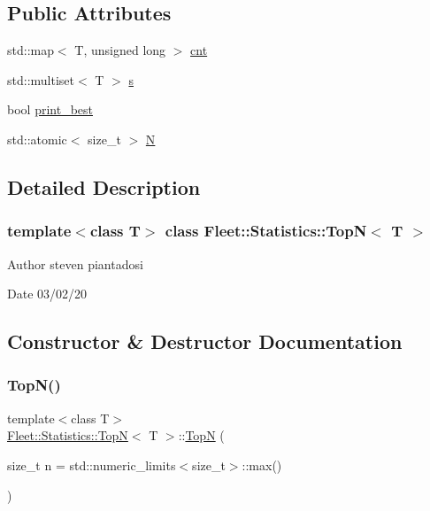 \subsection*{Public Attributes}
\begin{DoxyCompactItemize}
\item 
std\+::map$<$ T, unsigned long $>$ \hyperlink{class_fleet_1_1_statistics_1_1_top_n_a0f5ecded3f85aeeb85da2f2b3056b466}{cnt}
\item 
std\+::multiset$<$ T $>$ \hyperlink{class_fleet_1_1_statistics_1_1_top_n_aa17d03f1154073197161f59657d4c80b}{s}
\item 
bool \hyperlink{class_fleet_1_1_statistics_1_1_top_n_a1ee284a643f14a5c4670b4c5f61f5262}{print\+\_\+best}
\item 
std\+::atomic$<$ size\+\_\+t $>$ \hyperlink{class_fleet_1_1_statistics_1_1_top_n_a7a9612e75b42451eef7db77498050e7a}{N}
\end{DoxyCompactItemize}


\subsection{Detailed Description}
\subsubsection*{template$<$class T$>$\newline
class Fleet\+::\+Statistics\+::\+Top\+N$<$ T $>$}

\begin{DoxyAuthor}{Author}
steven piantadosi 
\end{DoxyAuthor}
\begin{DoxyDate}{Date}
03/02/20 
\end{DoxyDate}


\subsection{Constructor \& Destructor Documentation}
\mbox{\label{class_fleet_1_1_statistics_1_1_top_n_afd0ca4daca84e66e91a4101cb009af44}} 
\subsubsection{\texorpdfstring{Top\+N()}{TopN()}\hspace{0.1cm}{\footnotesize\ttfamily [1/3]}}
{\footnotesize\ttfamily template$<$class T$>$ \\
\hyperlink{class_fleet_1_1_statistics_1_1_top_n}{Fleet\+::\+Statistics\+::\+TopN}$<$ T $>$\+::\hyperlink{class_fleet_1_1_statistics_1_1_top_n}{TopN} (\begin{DoxyParamCaption}\item[{size\+\_\+t}]{n = {\ttfamily std\+:\+:numeric\+\_\+limits$<$size\+\_\+t$>$\+:\+:max()} }\end{DoxyParamCaption})\hspace{0.3cm}{\ttfamily [inline]}}

